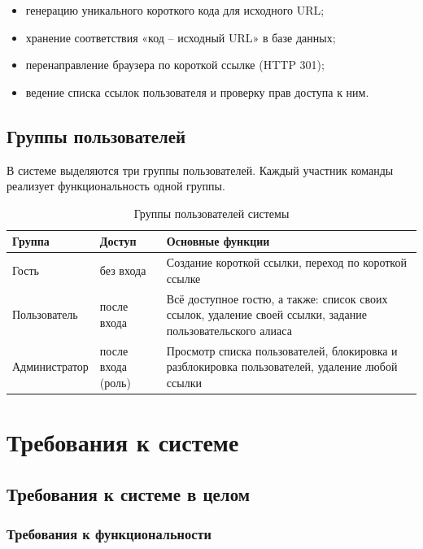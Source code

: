 \documentclass[14pt, a4paper]{extarticle}
\begin{document}
\begin{itemize}
	\item генерацию уникального короткого кода для исходного URL;
	\item хранение соответствия «код -- исходный URL» в базе данных;
	\item перенаправление браузера по короткой ссылке (HTTP 301);
	\item ведение списка ссылок пользователя и проверку прав доступа к ним.
\end{itemize}

\subsection{Группы пользователей}

В системе выделяются три группы пользователей. Каждый участник команды реализует функциональность одной группы.

\begin{table}[h]
\centering
\caption{Группы пользователей системы}
\label{tab:users}
\begin{tabular}{|p{3.4cm}|p{3.2cm}|p{6.9cm}|}
\hline
\textbf{Группа} & \textbf{Доступ} & \textbf{Основные функции} \\
\hline
Гость & без входа & Создание короткой ссылки, переход по короткой ссылке \\
\hline
Пользователь & после входа & Всё доступное гостю, а также: список своих ссылок, удаление своей ссылки, задание пользовательского алиаса \\
\hline
Администратор & после входа (роль) & Просмотр списка пользователей, блокировка и разблокировка пользователей, удаление любой ссылки \\
\hline
\end{tabular}
\end{table}

\section{Требования к системе}

\subsection{Требования к системе в целом}

\subsubsection{Требования к функциональности}
\end{document}
